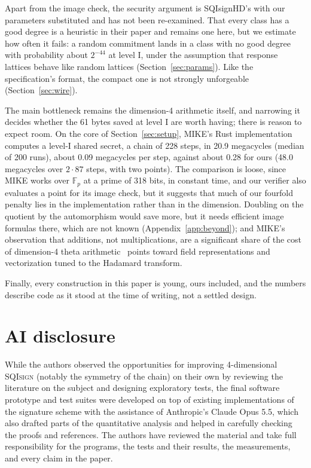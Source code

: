 \documentclass[version=preprint]{iacrcc}
\newcommand{\SQIsign}{SQI{\textsc{sign}}}
\begin{document}
    Apart from the image check, the security argument is SQIsignHD's with our
    parameters substituted and has not been re-examined. That every class
    has a good degree is a heuristic in their paper and remains one here, but
    we estimate how often it fails: a random commitment lands in a class with
    no good degree with probability about $2^{-44}$ at level I, under the
    assumption that response lattices behave like random lattices
    (Section~\ref{sec:params}). Like the specification's
    format, the compact one is not strongly unforgeable
    (Section~\ref{sec:wire}).

    The main bottleneck remains the dimension-4 arithmetic itself, and
    narrowing it decides whether the 61 bytes saved at level I are worth
    having; there is reason to expect room. On the core of
    Section~\ref{sec:setup}, MIKE's Rust implementation~\cite{BDD+26} computes a
    level-I shared secret, a chain of 228 steps, in 20.9 megacycles (median of
    200 runs), about 0.09 megacycles per step,
    against about 0.28 for ours (48.0 megacycles over $2 \cdot
    87$ steps, with two points). The comparison is loose, since MIKE works over $\mathbb{F}_p$
    at a prime of 318 bits, in constant time, and our verifier also evaluates a point for its
    image check, but it suggests that much of our fourfold penalty lies in the
    implementation rather than in the dimension. Doubling on the quotient by
    the automorphism would save more, but it needs efficient image formulas
    there, which are not known (Appendix~\ref{app:beyond}); and MIKE's
    observation that additions, not
    multiplications, are a significant share of the cost of dimension-4 theta
    arithmetic~\cite[Section 6]{BDD+26} points toward field representations
    and vectorization tuned to the Hadamard transform.

    Finally, every construction in this paper is young, ours included, and the
    numbers describe code as it stood at the time of writing, not a settled design.

\section*{AI disclosure}
    While the authors observed the opportunities for improving 4-dimensional {\SQIsign} (notably the symmetry of the chain) on their own by reviewing the literature on the subject and designing exploratory tests, the final software prototype and test suites were developed on top of existing implementations of the signature scheme with the assistance of Anthropic's Claude Opus 5.5, which also drafted parts of the quantitative analysis and helped in carefully checking the proofs and references.
    The authors have reviewed the material and take full responsibility for the programs, the tests and their results, the measurements, and every claim in the paper.
\end{document}
